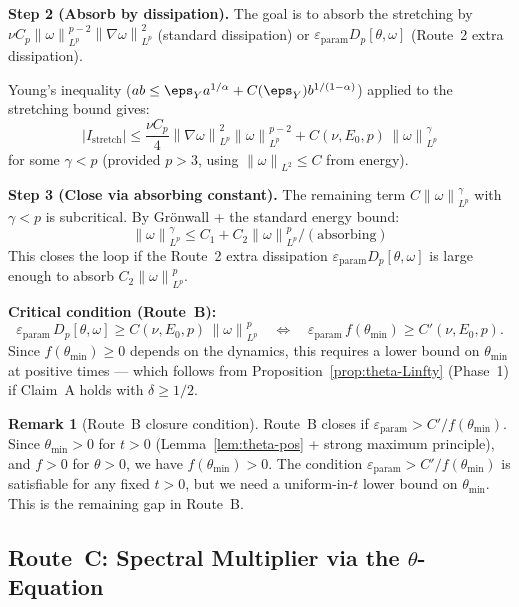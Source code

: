 \documentclass[11pt]{article}
\theoremstyle{definition}
\newtheorem{remark}[theorem]{Remark}
\theoremstyle{remark}
\newcommand{\norm}[1]{\left\|#1\right\|}
\newcommand{\abs}[1]{\left|#1\right|}
\newcommand{\grad}{\nabla}
\newcommand{\epsp}{\varepsilon_{\mathrm{param}}}
\begin{document}
\textbf{Step 2 (Absorb by dissipation).}
The goal is to absorb the stretching by
$\nu C_p\norm{\omega}^{p-2}_{L^p}\norm{\grad\omega}^2_{L^p}$ (standard dissipation)
or $\epsp D_p[\theta,\omega]$ (Route~2 extra dissipation).

Young's inequality ($ab\leq \eps_Y a^{1/\alpha} + C(\eps_Y)b^{1/(1-\alpha)}$) applied to the
stretching bound gives:
\begin{equation}\label{eq:Young}
  \abs{I_{\mathrm{stretch}}}
  \leq \frac{\nu C_p}{4}\norm{\grad\omega}^2_{L^p}\norm{\omega}^{p-2}_{L^p}
    + C(\nu,E_0,p)\,\norm{\omega}^\gamma_{L^p}
\end{equation}
for some $\gamma<p$ (provided $p>3$, using $\norm{\omega}_{L^2}\leq C$ from energy).

\textbf{Step 3 (Close via absorbing constant).}
The remaining term $C\norm{\omega}^\gamma_{L^p}$ with $\gamma<p$ is subcritical.
By Gr\"onwall + the standard energy bound:
\begin{equation}
  \norm{\omega}^\gamma_{L^p} \leq C_1 + C_2\norm{\omega}^p_{L^p}/(\text{absorbing})
\end{equation}
This closes the loop if the Route~2 extra dissipation $\epsp D_p[\theta,\omega]$
is large enough to absorb $C_2\norm{\omega}^p_{L^p}$.

\textbf{Critical condition (Route~B):}
\begin{equation}\label{eq:routeB-condition}
  \epsp\,D_p[\theta,\omega] \geq C(\nu,E_0,p)\,\norm{\omega}^p_{L^p}
  \quad \Leftrightarrow \quad
  \epsp\,f(\theta_{\min}) \geq C'(\nu,E_0,p).
\end{equation}
Since $f(\theta_{\min})\geq 0$ depends on the dynamics, this requires
a lower bound on $\theta_{\min}$ at positive times — which follows from
Proposition~\ref{prop:theta-Linfty} (Phase~1) if Claim~A holds with $\delta\geq 1/2$.

\begin{remark}[Route~B closure condition]
  Route~B closes if $\epsp>C'/f(\theta_{\min})$.  Since $\theta_{\min}>0$
  for $t>0$ (Lemma~\ref{lem:theta-pos} + strong maximum principle), and
  $f>0$ for $\theta>0$, we have $f(\theta_{\min})>0$.  The condition
  $\epsp>C'/f(\theta_{\min})$ is satisfiable for any fixed $t>0$, but
  we need a uniform-in-$t$ lower bound on $\theta_{\min}$.  This is the
  remaining gap in Route~B.
\end{remark}

\subsection{Route~C: Spectral Multiplier via the $\theta$-Equation}
\label{sec:routeC}
\end{document}
